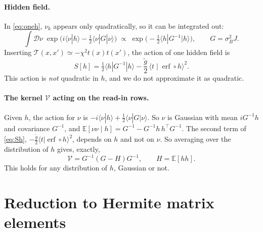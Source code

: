 \documentclass[11pt,a4paper]{article}
\newcommand{\E}{\mathbb{E}}
\newcommand{\erf}{\operatorname{erf}}
\begin{document}
\paragraph{Hidden field.}
In \eqref{eq:oneh}, $\nu_k$ appears only quadratically, so it can be integrated out:
\begin{equation}
  \int\!\mathcal D\nu\;\exp\!\big(i\langle\nu|h\rangle-\tfrac12\langle\nu|G|\nu\rangle\big)\;\propto\;\exp\!\big(-\tfrac12\langle h|G^{-1}|h\rangle\big),
  \qquad G=\sigma_B^2J .
  \label{eq:G}
\end{equation}
Inserting $\mathcal T(x,x')\simeq-\chi^2t(x)t(x')$, the action of one hidden field is
\begin{equation}
  S[h]=\tfrac12\langle h|G^{-1}|h\rangle-\frac{\tilde g}{2}\,\langle t\mid\erf\circ h\rangle^2 .
  \label{eq:Sh}
\end{equation}
This action is \emph{not} quadratic in $h$, and we do not approximate it as quadratic.

\paragraph{The kernel $\mathcal V$ acting on the read-in rows.}
Given $h$, the action for $\nu$ is $-i\langle\nu|h\rangle+\frac12\langle\nu|G|\nu\rangle$.
So $\nu$ is Gaussian with mean $iG^{-1}h$ and covariance $G^{-1}$, and
$\E[\nu\nu\mid h]=G^{-1}-G^{-1}h\,h^\top G^{-1}$.
The second term of \eqref{eq:Sh}, $-\frac{\tilde g}{2}\langle t|\erf\circ h\rangle^2$, depends on $h$ and not on $\nu$.
So averaging over the distribution of $h$ gives, exactly,
\begin{equation}
  \mathcal V=G^{-1}(G-H)G^{-1},\qquad H=\E[hh].
  \label{eq:V}
\end{equation}
This holds for any distribution of $h$, Gaussian or not.

\section{Reduction to Hermite matrix elements}
\end{document}

